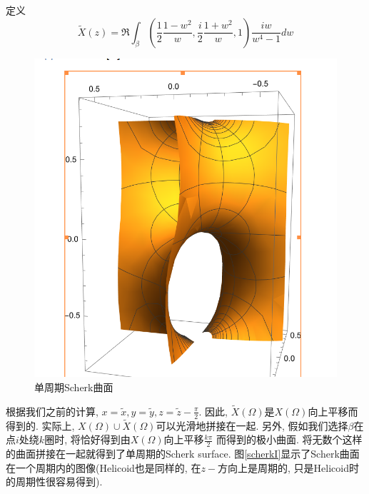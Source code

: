 定义
\begin{equation}
    \tilde{X}(z)=\Re \int_{\beta}(\frac{1}{2}\frac{1-w^2}{w}, \frac{i}{2}\frac{1+w^2}{w},1)\frac{iw}{w^4-1}dw
\end{equation}
\begin{figure}[ht]
    \centering
    \includegraphics[scale=0.5]{images/scherkI.png}
    \caption{单周期Scherk曲面}
    \label{scherkI}
\end{figure}
根据我们之前的计算, $x=\tilde{x}, y=\tilde{y}, z=\tilde{z}-\frac{\pi}{2}$. 因此, $\tilde{X}(\Omega)$是$X(\Omega)$向上平移而得到的. 实际上, $X(\Omega)\cup \tilde{X}(\Omega)$可以光滑地拼接在一起. 另外, 假如我们选择$\beta$在点$i$处绕$k$圈时, 将恰好得到由$X(\Omega)$向上平移$\frac{k\pi}{2}$ 而得到的极小曲面. 将无数个这样的曲面拼接在一起就得到了单周期的Scherk surface. 图\eqref{scherkI}显示了Scherk曲面在一个周期内的图像(Helicoid也是同样的, 在$z-$方向上是周期的, 只是Helicoid时的周期性很容易得到).

